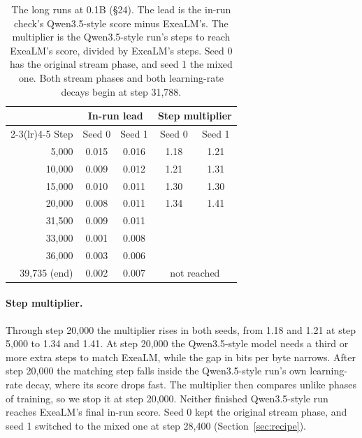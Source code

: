 \documentclass[10pt,twocolumn,letterpaper]{article}
\newcommand{\sect}[1]{\S#1}
\begin{document}
\begin{table}[t]
\centering\small
\caption{The long runs at 0.1B (\sect{24}). The lead is the in-run check's Qwen3.5-style score minus ExeaLM's. The multiplier is the Qwen3.5-style run's steps to reach ExeaLM's score, divided by ExeaLM's steps. Seed 0 has the original stream phase, and seed 1 the mixed one. Both stream phases and both learning-rate decays begin at step 31,788.}
\label{tab:long}
\setlength{\tabcolsep}{4pt}
\begin{tabular}{@{}r cc cc@{}}
\toprule
& \multicolumn{2}{c}{In-run lead} & \multicolumn{2}{c}{Step multiplier} \\
\cmidrule(lr){2-3}\cmidrule(lr){4-5}
Step & Seed 0 & Seed 1 & Seed 0 & Seed 1 \\
\midrule
5,000 & 0.015 & 0.016 & 1.18 & 1.21 \\
10,000 & 0.009 & 0.012 & 1.21 & 1.31 \\
15,000 & 0.010 & 0.011 & 1.30 & 1.30 \\
20,000 & 0.008 & 0.011 & 1.34 & 1.41 \\
31,500 & 0.009 & 0.011 & & \\
33,000 & 0.001 & 0.008 & & \\
36,000 & 0.003 & 0.006 & & \\
39,735 (end) & 0.002 & 0.007 & \multicolumn{2}{c}{not reached} \\
\bottomrule
\end{tabular}
\end{table}

\paragraph{Step multiplier.}
Through step 20,000 the multiplier rises in both seeds, from 1.18 and 1.21 at step 5,000 to 1.34 and 1.41.
At step 20,000 the Qwen3.5-style model needs a third or more extra steps to match ExeaLM, while the gap in bits per byte narrows.
After step 20,000 the matching step falls inside the Qwen3.5-style run's own learning-rate decay, where its score drops fast.
The multiplier then compares unlike phases of training, so we stop it at step 20,000.
Neither finished Qwen3.5-style run reaches ExeaLM's final in-run score.
Seed 0 kept the original stream phase, and seed 1 switched to the mixed one at step 28,400 (Section~\ref{sec:recipe}).
\end{document}
